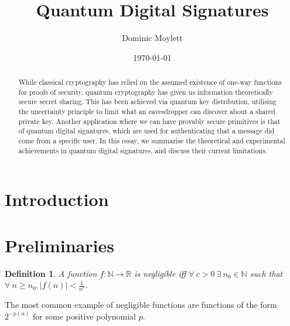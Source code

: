 \documentclass[%
 reprint,
 amsmath,amssymb,
 aps,
 pra,
]{revtex4-1}
\newtheorem{definition}{Definition}[section]
\begin{document}
\title{Quantum Digital Signatures}

\author{Dominic Moylett}
%

\date{\today}%

\begin{abstract}
While classical cryptography has relied on the assumed existence of one-way functions for proofs of security, quantum cryptography has given us information theoretically secure secret sharing. This has been achieved via quantum key distribution, utilising the uncertainty principle to limit what an eavesdropper can discover about a shared private key. Another application where we can have provably secure primitives is that of quantum digital signatures, which are used for authenticating that a message did come from a specific user. In this essay, we summarise the theoretical and experimental achievements in quantum digital signatures, and discuss their current limitations.
\end{abstract}

\maketitle


\section{Introduction}

\section{Preliminaries}

\begin{definition}
A function $f:\mathbb{N}\rightarrow\mathbb{R}$ is negligible iff $\forall~ c > 0 ~\exists~ n_0 \in \mathbb{N}$ such that $\forall~ n \geq n_0, |f(n)| < \frac{1}{n^c}$.
\end{definition}

The most common example of negligible functions are functions of the form $2^{-p(n)}$ for some positive polynomial $p$.
\end{document}
